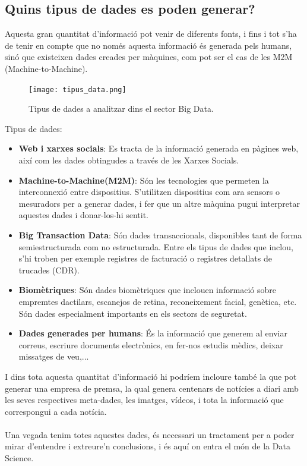 \documentclass[12pt,a4paper,openright,oneside]{article}
\numberwithin{equation}{section}
\theoremstyle{definition}
\begin{document}
\subsection*{Quins tipus de dades es poden generar?}
Aquesta gran quantitat d'informació pot venir de diferents fonts, i fins i tot s'ha de tenir en compte que no només aquesta informació és generada pels humans, sinó que existeixen dades creades per màquines, com pot ser el cas de les M2M (Machine-to-Machine).
\begin{figure}[htbp]
\centering
\texttt{[image: tipus\_data.png]}
\caption{Tipus de dades a analitzar dins el sector Big Data.}
\end{figure}
Tipus de dades:
\begin{itemize}
\item \textbf{Web i xarxes socials}: Es tracta de la informació generada en pàgines web, així com les dades obtingudes a través de les Xarxes Socials.
\item \textbf{Machine-to-Machine(M2M)}: Són les tecnologies que permeten la interconnexió entre dispositius. S'utilitzen dispositius com ara sensors o mesuradors per a generar dades, i fer que un altre màquina pugui interpretar aquestes dades i donar-los-hi sentit.
\item \textbf{Big Transaction Data}: Són dades transaccionals, disponibles tant de forma semiestructurada com no estructurada. Entre els tipus de dades que inclou, s'hi troben per exemple registres de facturació o registres detallats de trucades (CDR).
\item \textbf{Biomètriques}: Són dades biomètriques que inclouen informació sobre empremtes dactilars, escanejos de retina, reconeixement facial, genètica, etc. Són dades especialment importants en els sectors de seguretat. 
\item \textbf{Dades generades per humans}: És la informació que generem al enviar correus, escriure documents electrònics, en fer-nos estudis mèdics, deixar missatges de veu,... 
\end{itemize}
I dins tota aquesta quantitat d'informació hi podríem incloure també la que pot generar una empresa de premsa, la qual genera centenars de notícies a diari amb les seves respectives meta-dades, les imatges, vídeos, i tota la informació que correspongui a cada notícia.\\\\
Una vegada tenim totes aquestes dades, és necessari un tractament per a poder mirar d'entendre i extreure'n conclusions, i és aquí on entra el món de la Data Science.
\end{document}
